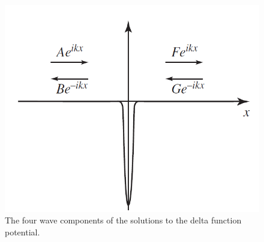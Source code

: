 \begin{figure}[ht!]
    \centering
    \includegraphics[width=0.5\linewidth]{./res/Pics/DeltaFunctionPotentialWaves.png}
    \caption{The four wave components of the solutions to the delta function potential.}
    \label{fig:DeltaFunctionPotentialWaves}
\end{figure}


